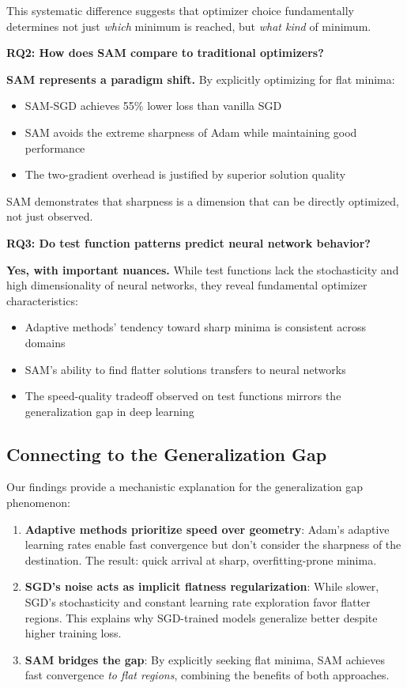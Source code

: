 \documentclass[12pt,a4paper]{article}
\begin{document}
This systematic difference suggests that optimizer choice fundamentally determines not just \emph{which} minimum is reached, but \emph{what kind} of minimum.

\textbf{RQ2: How does SAM compare to traditional optimizers?}

\textbf{SAM represents a paradigm shift.} By explicitly optimizing for flat minima:
\begin{itemize}
    \item SAM-SGD achieves 55\% lower loss than vanilla SGD
    \item SAM avoids the extreme sharpness of Adam while maintaining good performance
    \item The two-gradient overhead is justified by superior solution quality
\end{itemize}

SAM demonstrates that sharpness is a dimension that can be directly optimized, not just observed.

\textbf{RQ3: Do test function patterns predict neural network behavior?}

\textbf{Yes, with important nuances.} While test functions lack the stochasticity and high dimensionality of neural networks, they reveal fundamental optimizer characteristics:
\begin{itemize}
    \item Adaptive methods' tendency toward sharp minima is consistent across domains
    \item SAM's ability to find flatter solutions transfers to neural networks~\cite{foret2020sharpness}
    \item The speed-quality tradeoff observed on test functions mirrors the generalization gap in deep learning
\end{itemize}

\subsection{Connecting to the Generalization Gap}

Our findings provide a mechanistic explanation for the generalization gap phenomenon:

\begin{enumerate}
    \item \textbf{Adaptive methods prioritize speed over geometry}: Adam's adaptive learning rates enable fast convergence but don't consider the sharpness of the destination. The result: quick arrival at sharp, overfitting-prone minima.
    
    \item \textbf{SGD's noise acts as implicit flatness regularization}: While slower, SGD's stochasticity and constant learning rate exploration favor flatter regions. This explains why SGD-trained models generalize better despite higher training loss.
    
    \item \textbf{SAM bridges the gap}: By explicitly seeking flat minima, SAM achieves fast convergence \emph{to flat regions}, combining the benefits of both approaches.
\end{enumerate}
\end{document}
